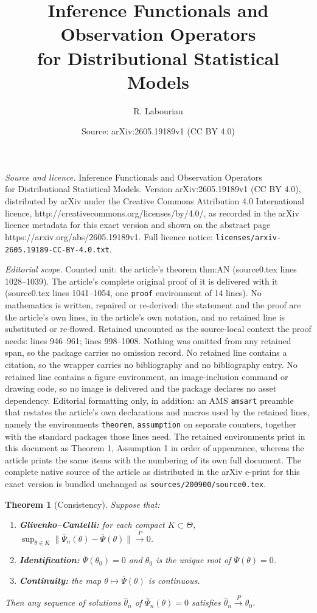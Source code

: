 \documentclass[10pt,a4paper]{amsart}
\title{Inference Functionals and Observation Operators \\ for Distributional Statistical Models}
\author{R. Labouriau}
\date{Source: arXiv:2605.19189v1 (CC BY 4.0)}
\newtheorem{theorem}{Theorem}
\begin{document}
\maketitle

\noindent\emph{Source and licence.} Inference Functionals and Observation Operators \\ for Distributional Statistical Models. Version arXiv:2605.19189v1 (CC BY 4.0), distributed by arXiv under the Creative Commons Attribution 4.0 International licence, http://creativecommons.org/licenses/by/4.0/, as recorded in the arXiv licence metadata for this exact version and shown on the abstract page https://arxiv.org/abs/2605.19189v1. Full licence notice: \texttt{licenses/arxiv-2605.19189-CC-BY-4.0.txt}.\par\smallskip

\noindent\textit{Editorial scope.} Counted unit: the article's theorem thm:AN (source0.tex lines 1028--1039). The article's complete original proof of it is delivered with it (source0.tex lines 1041--1054, one \texttt{proof} environment of 14 lines). No mathematics is written, repaired or re-derived: the statement and the proof are the article's own lines, in the article's own notation, and no retained line is substituted or re-flowed.  Retained uncounted as the source-local context the proof needs: lines 946--961; lines 998--1008.  Nothing was omitted from any retained span, so the package carries no omission record.  No retained line contains a citation, so the wrapper carries no bibliography and no bibliography entry.  No retained line contains a figure environment, an image-inclusion command or drawing code, so no image is delivered and the package declares no asset dependency.  Editorial formatting only, in addition: an AMS \texttt{amsart} preamble that restates the article's own declarations and macros used by the retained lines, namely the environments \texttt{theorem}, \texttt{assumption} on separate counters, together with the standard packages those lines need.  The retained environments print in this document as Theorem 1, Assumption 1 in order of appearance, whereas the article prints the same items with the numbering of its own full document.  The complete native source of the article as distributed in the arXiv e-print for this exact version is bundled unchanged as \texttt{sources/200900/source0.tex}.
\begin{theorem}[Consistency]\label{thm:consistency}
Suppose that:
\begin{enumerate}
\item \textbf{Glivenko--Cantelli:} for each compact $K \subset \Theta$,
$\sup_{\theta \in K} \|\bar\Psi_n(\theta) - \bar\Psi(\theta)\|
\xrightarrow{P} 0$.

\item \textbf{Identification:} $\bar\Psi(\theta_0) = 0$ and $\theta_0$ is the unique root of
$\bar\Psi(\theta) = 0$.

\item \textbf{Continuity:} the map $\theta \mapsto \bar\Psi(\theta)$ is
continuous.
\end{enumerate}
Then any sequence of solutions $\hat\theta_n$ of $\bar\Psi_n(\theta) = 0$
satisfies $\hat\theta_n \xrightarrow{P} \theta_0$.
\end{theorem}
\end{document}
